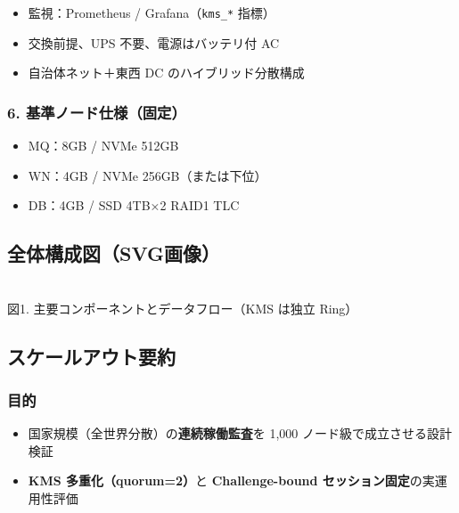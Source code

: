 \documentclass[
]{article}
\makeatletter
\newcommand*\pandocbounded[1]{%
  \sbox\pandoc@box{#1}%
  \Gscale@div\@tempa{\textheight}{\dimexpr\ht\pandoc@box+\dp\pandoc@box\relax}%
  \Gscale@div\@tempb{\linewidth}{\wd\pandoc@box}%
  \ifdim\@tempb\p@<\@tempa\p@\let\@tempa\@tempb\fi%
  \ifdim\@tempa\p@<\p@\scalebox{\@tempa}{\usebox\pandoc@box}%
  \else\usebox{\pandoc@box}%
  \fi%
}
\providecommand{\tightlist}{%
  \setlength{\itemsep}{0pt}\setlength{\parskip}{0pt}}
\makeatother
\begin{document}
\begin{itemize}
\tightlist
\item
  監視：Prometheus / Grafana（\texttt{kms\_*} 指標）\\
\item
  交換前提、UPS 不要、電源はバッテリ付 AC\\
\item
  自治体ネット＋東西 DC のハイブリッド分散構成
\end{itemize}

\subsubsection{6.
基準ノード仕様（固定）}\label{ux57faux6e96ux30ceux30fcux30c9ux4ed5ux69d8ux56faux5b9a}

\begin{itemize}
\tightlist
\item
  MQ：8GB / NVMe 512GB\\
\item
  WN：4GB / NVMe 256GB（または下位）\\
\item
  DB：4GB / SSD 4TB×2 RAID1 TLC
\end{itemize}

\subsection{全体構成図（SVG画像）}\label{ux5168ux4f53ux69cbux6210ux56f3svgux753bux50cf}

\pandocbounded{}\\
図1. 主要コンポーネントとデータフロー（KMS は独立 Ring）

\subsection{スケールアウト要約}\label{ux30b9ux30b1ux30fcux30ebux30a2ux30a6ux30c8ux8981ux7d04}

\subsubsection{目的}\label{ux76eeux7684}

\begin{itemize}
\tightlist
\item
  国家規模（全世界分散）の\textbf{連続稼働監査}を 1,000
  ノード級で成立させる設計検証\\
\item
  \textbf{KMS 多重化（quorum=2）}と \textbf{Challenge-bound
  セッション固定}の実運用性評価
\end{itemize}
\end{document}
